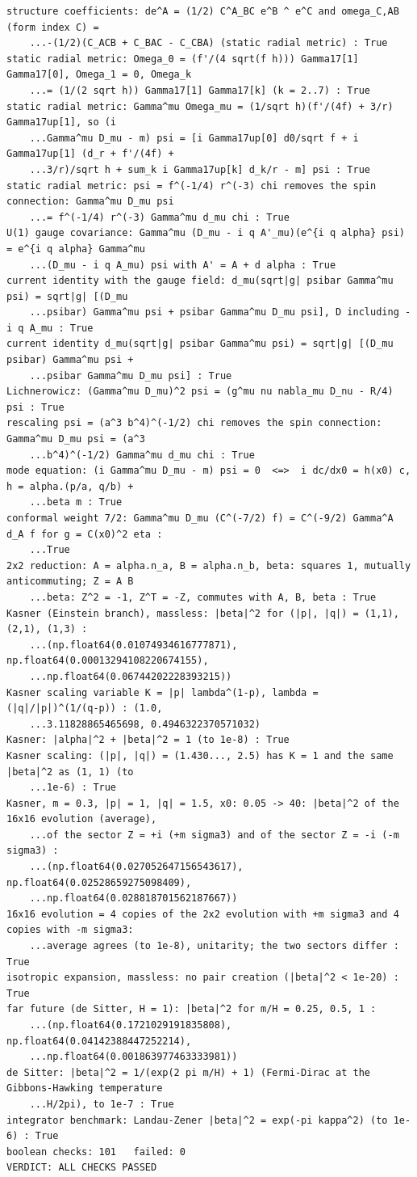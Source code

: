 \documentclass[10pt,a4paper]{article}
\begin{document}
\begin{Verbatim}[fontsize=\small,frame=single,framesep=2mm]
structure coefficients: de^A = (1/2) C^A_BC e^B ^ e^C and omega_C,AB (form index C) =
    ...-(1/2)(C_ACB + C_BAC - C_CBA) (static radial metric) : True
static radial metric: Omega_0 = (f'/(4 sqrt(f h))) Gamma17[1] Gamma17[0], Omega_1 = 0, Omega_k
    ...= (1/(2 sqrt h)) Gamma17[1] Gamma17[k] (k = 2..7) : True
static radial metric: Gamma^mu Omega_mu = (1/sqrt h)(f'/(4f) + 3/r) Gamma17up[1], so (i
    ...Gamma^mu D_mu - m) psi = [i Gamma17up[0] d0/sqrt f + i Gamma17up[1] (d_r + f'/(4f) +
    ...3/r)/sqrt h + sum_k i Gamma17up[k] d_k/r - m] psi : True
static radial metric: psi = f^(-1/4) r^(-3) chi removes the spin connection: Gamma^mu D_mu psi
    ...= f^(-1/4) r^(-3) Gamma^mu d_mu chi : True
U(1) gauge covariance: Gamma^mu (D_mu - i q A'_mu)(e^{i q alpha} psi) = e^{i q alpha} Gamma^mu
    ...(D_mu - i q A_mu) psi with A' = A + d alpha : True
current identity with the gauge field: d_mu(sqrt|g| psibar Gamma^mu psi) = sqrt|g| [(D_mu
    ...psibar) Gamma^mu psi + psibar Gamma^mu D_mu psi], D including -i q A_mu : True
current identity d_mu(sqrt|g| psibar Gamma^mu psi) = sqrt|g| [(D_mu psibar) Gamma^mu psi +
    ...psibar Gamma^mu D_mu psi] : True
Lichnerowicz: (Gamma^mu D_mu)^2 psi = (g^mu nu nabla_mu D_nu - R/4) psi : True
rescaling psi = (a^3 b^4)^(-1/2) chi removes the spin connection: Gamma^mu D_mu psi = (a^3
    ...b^4)^(-1/2) Gamma^mu d_mu chi : True
mode equation: (i Gamma^mu D_mu - m) psi = 0  <=>  i dc/dx0 = h(x0) c, h = alpha.(p/a, q/b) +
    ...beta m : True
conformal weight 7/2: Gamma^mu D_mu (C^(-7/2) f) = C^(-9/2) Gamma^A d_A f for g = C(x0)^2 eta :
    ...True
2x2 reduction: A = alpha.n_a, B = alpha.n_b, beta: squares 1, mutually anticommuting; Z = A B
    ...beta: Z^2 = -1, Z^T = -Z, commutes with A, B, beta : True
Kasner (Einstein branch), massless: |beta|^2 for (|p|, |q|) = (1,1), (2,1), (1,3) :
    ...(np.float64(0.01074934616777871), np.float64(0.00013294108220674155),
    ...np.float64(0.06744202228393215))
Kasner scaling variable K = |p| lambda^(1-p), lambda = (|q|/|p|)^(1/(q-p)) : (1.0,
    ...3.11828865465698, 0.4946322370571032)
Kasner: |alpha|^2 + |beta|^2 = 1 (to 1e-8) : True
Kasner scaling: (|p|, |q|) = (1.430..., 2.5) has K = 1 and the same |beta|^2 as (1, 1) (to
    ...1e-6) : True
Kasner, m = 0.3, |p| = 1, |q| = 1.5, x0: 0.05 -> 40: |beta|^2 of the 16x16 evolution (average),
    ...of the sector Z = +i (+m sigma3) and of the sector Z = -i (-m sigma3) :
    ...(np.float64(0.027052647156543617), np.float64(0.02528659275098409),
    ...np.float64(0.028818701562187667))
16x16 evolution = 4 copies of the 2x2 evolution with +m sigma3 and 4 copies with -m sigma3:
    ...average agrees (to 1e-8), unitarity; the two sectors differ : True
isotropic expansion, massless: no pair creation (|beta|^2 < 1e-20) : True
far future (de Sitter, H = 1): |beta|^2 for m/H = 0.25, 0.5, 1 :
    ...(np.float64(0.1721029191835808), np.float64(0.04142388447252214),
    ...np.float64(0.001863977463333981))
de Sitter: |beta|^2 = 1/(exp(2 pi m/H) + 1) (Fermi-Dirac at the Gibbons-Hawking temperature
    ...H/2pi), to 1e-7 : True
integrator benchmark: Landau-Zener |beta|^2 = exp(-pi kappa^2) (to 1e-6) : True
boolean checks: 101   failed: 0
VERDICT: ALL CHECKS PASSED
\end{Verbatim}
\end{document}
